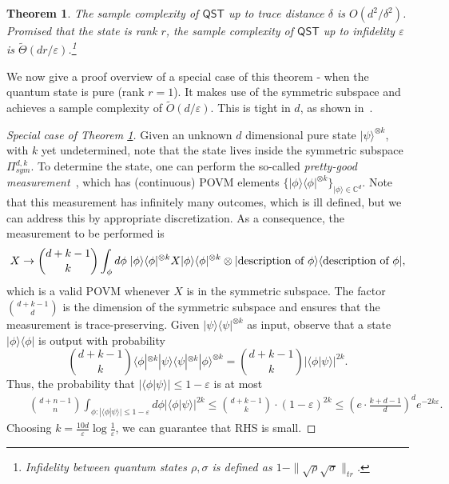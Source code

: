 \documentclass[11pt]{article}
\newcommand{\ket}[1]{|#1\rangle}
\newcommand{\bra}[1]{\langle#1|}
\newcommand{\ketbra}[2]{|#1\rangle\langle#2|}
\newcommand{\braketIP}[2]{\langle{#1}|{#2}\rangle}
\newtheorem{theorem}{Theorem}
\begin{document}
\begin{theorem}
\label{thm:tomsamcom}
The sample complexity of $\textsf{QST}$ up to trace distance $\delta$ is $O(d^2/\delta^2)$. Promised that the state is rank $r$, the sample complexity of $\textsf{QST}$ up to infidelity  $\varepsilon$ is $\tilde{\Theta}(dr/\varepsilon)$.\footnote{Infidelity between quantum states $\rho,\sigma$ is defined as $1-\|\sqrt{\rho}\sqrt{\sigma}\|_{tr}$.}
\end{theorem}
We now give a proof overview of a special case of this theorem - when the quantum state is pure (rank $r=1$). It makes use of the symmetric subspace and achieves a sample complexity of $\tilde{O}(d/\varepsilon)$. This is tight in $d$, as shown in~\cite{haah2017sample}.

\begin{proof}[Special case of Theorem \ref{thm:tomsamcom}]
Given an unknown $d$ dimensional pure state $\ket{\psi}^{\otimes k}$, with $k$ yet undetermined, note that the state lives inside the symmetric subspace $\Pi_{sym}^{d,k}$. To determine the state, one can perform  the so-called \emph{pretty-good measurement}~\cite{eldar2001quantum}, which has (continuous) POVM elements $\{\ketbra{\phi}{\phi}^{\otimes k}\}_{\ket{\phi}\in \mathbb{C}^d}$. Note that this measurement has infinitely many outcomes, which is ill defined, but we can address this by appropriate discretization. As a consequence, the measurement to be performed is 
$$
X \rightarrow {d+k-1\choose k} \int_{\phi}d\phi\hspace{1mm}\ketbra{\phi}{\phi}^{\otimes k}X\ketbra{\phi}{\phi}^{\otimes k}\otimes \ketbra{\text{description of }\phi}{\text{description of }\phi},
$$
which is a valid POVM whenever $X$ is in the symmetric subspace. The factor ${d+k-1\choose d}$ is the dimension of the symmetric subspace and ensures that the measurement is trace-preserving. Given $\ketbra{\psi}{\psi}^{\otimes k}$ as input, observe that a state $\ketbra{\phi}{\phi}$ is output with probability
$$
{d+k-1\choose k}\bra{\phi}^{\otimes k}\ketbra{\psi}{\psi}^{\otimes k}\ket{\phi}^{\otimes k}={d+k-1\choose k}|\braketIP{\phi}{\psi}|^{2k}.
$$
Thus, the probability that $|\braketIP{\phi}{\psi}|\leq 1-\varepsilon$ is at most
\begin{eqnarray*}
&&{d+n-1\choose n}\int_{\phi: |\braketIP{\phi}{\psi}|\leq 1-\varepsilon}d\phi|\braketIP{\phi}{\psi}|^{2k}\leq {d+k-1\choose k}\cdot (1-\varepsilon)^{2k}\leq \left(e\cdot\frac{k+d-1}{d}\right)^de^{-2k\varepsilon}.
\end{eqnarray*}
Choosing $k=\frac{10d}{\varepsilon}\log\frac{1}{\varepsilon}$, we can guarantee that RHS is small.
\end{proof}
\end{document}
